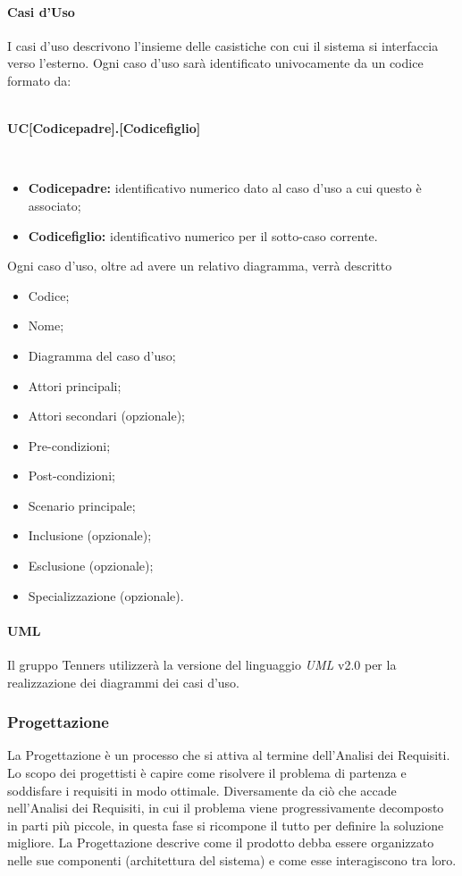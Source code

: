\paragraph{Casi d'Uso}
I casi d'uso descrivono l'insieme delle casistiche con cui il sistema si interfaccia verso l'esterno. Ogni caso d'uso sarà identificato univocamente da un codice formato da:
\\\\
\centerline{\textbf{UC[Codicepadre].[Codicefiglio]}}\\

\begin{itemize}
	\item \textbf{Codicepadre:} identificativo numerico dato al caso d'uso a cui questo è associato;
	\item \textbf{Codicefiglio:} identificativo numerico per il sotto-caso corrente.
\end{itemize}
Ogni caso d'uso, oltre ad avere un relativo diagramma, verrà descritto 
\begin{itemize}
  \item Codice;
  \item Nome;
  \item Diagramma del caso d'uso;
  \item Attori principali;
  \item Attori secondari (opzionale);
  \item Pre-condizioni;
  \item Post-condizioni;
  \item Scenario principale;
  \item Inclusione (opzionale);
  \item Esclusione (opzionale);
  \item Specializzazione (opzionale).
\end{itemize}

\paragraph{UML\glo}
Il gruppo Tenners utilizzerà la versione del linguaggio \textit{UML\glo} v2.0 per la realizzazione dei diagrammi dei casi d'uso.
\subsubsection{Progettazione}
La Progettazione è un processo che si attiva al termine dell'Analisi dei Requisiti. Lo scopo dei progettisti è capire come risolvere il problema di partenza e soddisfare i requisiti in modo ottimale. Diversamente da ciò che accade nell'Analisi dei Requisiti, in cui il problema viene progressivamente decomposto in parti più piccole, in questa fase si ricompone il tutto per definire la soluzione migliore. La Progettazione descrive come il prodotto debba essere organizzato nelle sue componenti (architettura del sistema) e come esse interagiscono tra loro.
